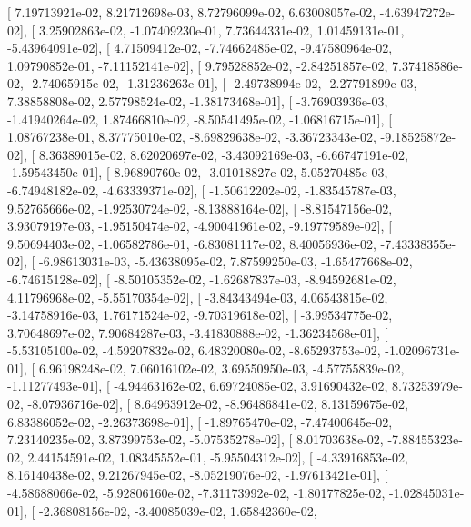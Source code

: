 \documentclass{article}
\begin{document}
       [  7.19713921e-02,   8.21712698e-03,   8.72796099e-02,
          6.63008057e-02,  -4.63947272e-02],
       [  3.25902863e-02,  -1.07409230e-01,   7.73644331e-02,
          1.01459131e-01,  -5.43964091e-02],
       [  4.71509412e-02,  -7.74662485e-02,  -9.47580964e-02,
          1.09790852e-01,  -7.11152141e-02],
       [  9.79528852e-02,  -2.84251857e-02,   7.37418586e-02,
         -2.74065915e-02,  -1.31236263e-01],
       [ -2.49738994e-02,  -2.27791899e-03,   7.38858808e-02,
          2.57798524e-02,  -1.38173468e-01],
       [ -3.76903936e-03,  -1.41940264e-02,   1.87466810e-02,
         -8.50541495e-02,  -1.06816715e-01],
       [  1.08767238e-01,   8.37775010e-02,  -8.69829638e-02,
         -3.36723343e-02,  -9.18525872e-02],
       [  8.36389015e-02,   8.62020697e-02,  -3.43092169e-03,
         -6.66747191e-02,  -1.59543450e-01],
       [  8.96890760e-02,  -3.01018827e-02,   5.05270485e-03,
         -6.74948182e-02,  -4.63339371e-02],
       [ -1.50612202e-02,  -1.83545787e-03,   9.52765666e-02,
         -1.92530724e-02,  -8.13888164e-02],
       [ -8.81547156e-02,   3.93079197e-03,  -1.95150474e-02,
         -4.90041961e-02,  -9.19779589e-02],
       [  9.50694403e-02,  -1.06582786e-01,  -6.83081117e-02,
          8.40056936e-02,  -7.43338355e-02],
       [ -6.98613031e-03,  -5.43638095e-02,   7.87599250e-03,
         -1.65477668e-02,  -6.74615128e-02],
       [ -8.50105352e-02,  -1.62687837e-03,  -8.94592681e-02,
          4.11796968e-02,  -5.55170354e-02],
       [ -3.84343494e-03,   4.06543815e-02,  -3.14758916e-03,
          1.76171524e-02,  -9.70319618e-02],
       [ -3.99534775e-02,   3.70648697e-02,   7.90684287e-03,
         -3.41830888e-02,  -1.36234568e-01],
       [ -5.53105100e-02,  -4.59207832e-02,   6.48320080e-02,
         -8.65293753e-02,  -1.02096731e-01],
       [  6.96198248e-02,   7.06016102e-02,   3.69550950e-03,
         -4.57755839e-02,  -1.11277493e-01],
       [ -4.94463162e-02,   6.69724085e-02,   3.91690432e-02,
          8.73253979e-02,  -8.07936716e-02],
       [  8.64963912e-02,  -8.96486841e-02,   8.13159675e-02,
          6.83386052e-02,  -2.26373698e-01],
       [ -1.89765470e-02,  -7.47400645e-02,   7.23140235e-02,
          3.87399753e-02,  -5.07535278e-02],
       [  8.01703638e-02,  -7.88455323e-02,   2.44154591e-02,
          1.08345552e-01,  -5.95504312e-02],
       [ -4.33916853e-02,   8.16140438e-02,   9.21267945e-02,
         -8.05219076e-02,  -1.97613421e-01],
       [ -4.58688066e-02,  -5.92806160e-02,  -7.31173992e-02,
         -1.80177825e-02,  -1.02845031e-01],
       [ -2.36808156e-02,  -3.40085039e-02,   1.65842360e-02,
\end{document}
